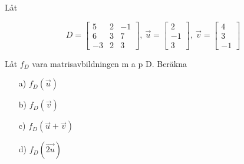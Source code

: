 Låt 

\[
	D = 
    \begin{bmatrix}
    5	&	2	&	-1	\\
    6	&	3	&	7	\\
    -3	&	2	&	3
    \end{bmatrix}  
    ,\>
    \vec{u} =
    \begin{bmatrix}
    2   	\\
   	-1 		\\
   	3		
   	\end{bmatrix}
   	,\>
    \vec{v} =
    \begin{bmatrix}
    4   	\\
   	3 		\\
   	-1		
   	\end{bmatrix}
\]

Låt $f_D$ vara matrisavbildningen m a p D. Beräkna
\begin{itemize}
	\item[a) ]	$f_{D}(\vec{u})$
	\item[b) ]	$f_{D}(\vec{v})$
	\item[c) ]	$f_{D}(\vec{u} + \vec{v})$
	\item[d) ]	$f_{D}(\vec{2u})$
\end{itemize}
